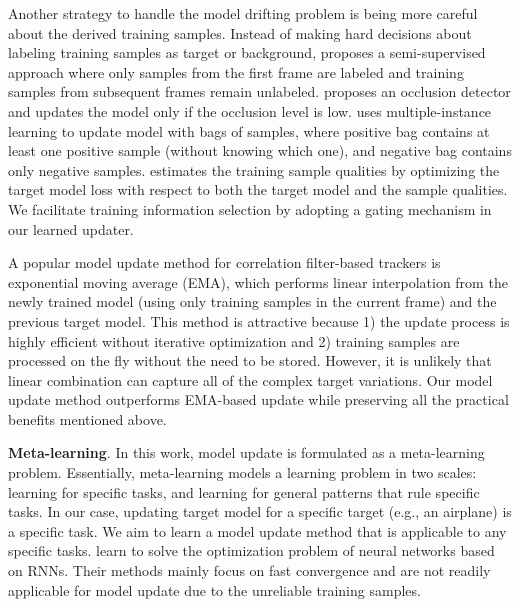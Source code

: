 \documentclass[journal]{IEEEtran}
\begin{document}
Another strategy to handle the model drifting problem is being more careful about the derived training samples. Instead of making hard decisions about labeling training samples as target or background, \cite{grabner2008semi} proposes a semi-supervised approach where only samples from the first frame are labeled and training samples from subsequent frames remain unlabeled. \cite{kwak2011learning} proposes an occlusion detector and updates the model only if the occlusion level is low. \cite{Babenko2011RobustOT} uses multiple-instance learning to update model with bags of samples, where positive bag contains at least one positive sample (without knowing which one), and negative bag contains only negative samples. \cite{Danelljan2016AdaptiveDO} estimates the training sample qualities by optimizing the target model loss with respect to both the target model and the sample qualities. We facilitate training information selection by adopting a gating mechanism in our learned updater.

A popular model update method for correlation filter-based trackers \cite{bolme2010visual, henriques2015high} is exponential moving average (EMA), which performs linear interpolation from the newly trained model (using only training samples in the current frame) and the previous target model. This method is attractive because 1) the update process is highly efficient without iterative optimization and 2) training samples are processed on the fly without the need to be stored. However, it is unlikely that linear combination can capture all of the complex target variations. Our model update method outperforms EMA-based update while preserving all the practical benefits mentioned above.

\textbf{Meta-learning}.
In this work, model update is formulated as a meta-learning problem. Essentially, meta-learning models a learning problem in two scales: learning for specific tasks, and learning for general patterns that rule specific tasks. In our case, updating target model for a specific target (e.g., an airplane) is a specific task. We aim to learn a model update method that is applicable to any specific tasks. \cite{Andrychowicz2016LearningTL, ravi2016optimization} learn to solve the optimization problem of neural networks based on RNNs. Their methods mainly focus on fast convergence and are not readily applicable for model update due to the unreliable training samples. 
\end{document}

